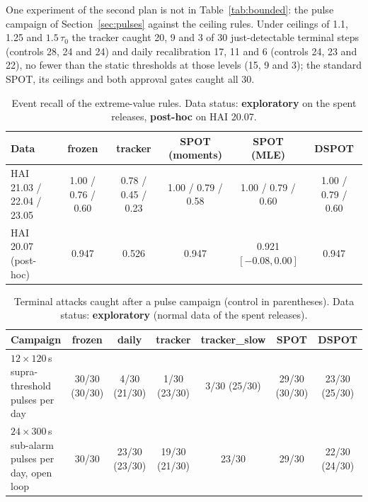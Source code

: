 \documentclass[letterpaper,twocolumn,10pt]{article}
\begin{document}
One experiment of the second plan is not in Table~\ref{tab:bounded}: the pulse campaign of
Section~\ref{sec:pulses} against the ceiling rules. Under ceilings of 1.1, 1.25 and $1.5\,\tau_0$ the
tracker caught 20, 9 and 3 of 30 just-detectable terminal steps (controls 28, 24 and 24) and daily
recalibration 17, 11 and 6 (controls 24, 23 and 22), no fewer than the static thresholds at those
levels (15, 9 and 3); the standard SPOT, its ceilings and both approval gates caught all 30.

\begin{table}[t]
\caption{Event recall of the extreme-value rules. Data status: \textbf{exploratory} on the spent
releases, \textbf{post-hoc} on HAI 20.07.}
\label{tab:evt}
\begin{tabularx}{\textwidth}{@{}Lccccc@{}}
\toprule
Data & frozen & tracker & SPOT (moments) & SPOT (MLE) & DSPOT \\
\midrule
HAI 21.03 / 22.04 / 23.05 & 1.00 / 0.76 / 0.60 & 0.78 / 0.45 / 0.23 & 1.00 / 0.79 / 0.58 & 1.00 / 0.79 / 0.60 & 1.00 / 0.79 / 0.60 \\
HAI 20.07 (post-hoc) & 0.947 & 0.526 & 0.947 & 0.921 $[-0.08, 0.00]$ & 0.947 \\
\bottomrule
\end{tabularx}
\end{table}

\begin{table}[t]
\caption{Terminal attacks caught after a pulse campaign (control in parentheses). Data status:
\textbf{exploratory} (normal data of the spent releases).}
\label{tab:pulses}
\begin{tabularx}{\textwidth}{@{}Lcccccc@{}}
\toprule
Campaign & frozen & daily & tracker & tracker\_slow & SPOT & DSPOT \\
\midrule
$12 \times 120$\,s supra-threshold pulses per day & 30/30 (30/30) & 4/30 (21/30) & 1/30 (23/30) & 3/30 (25/30) & 29/30 (30/30) & 23/30 (25/30) \\
$24 \times 300$\,s sub-alarm pulses per day, open loop & 30/30 & 23/30 (23/30) & 19/30 (21/30) & 23/30 & 29/30 & 22/30 (24/30) \\
\bottomrule
\end{tabularx}
\end{table}
\end{document}
